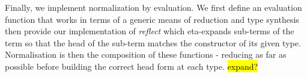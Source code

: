 Finally, we implement normalization by evaluation. We first define an evaluation
function that works in terms of a generic means of reduction and type synthesis
then provide our implementation of \emph{reflect} which eta-expands sub-terms of
the term so that the head of the sub-term matches the constructor of its given
type. Normalisation is then the composition of these functions - reducing as far
as possible before building the correct head form at each type. \hl{expand?}
